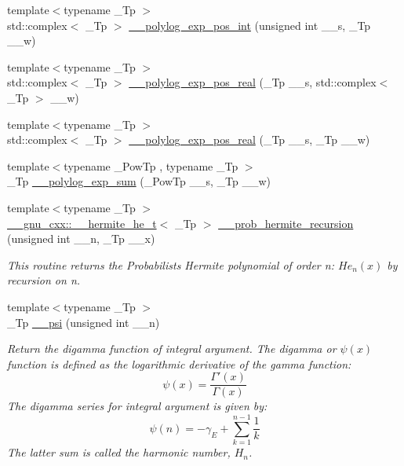 \begin{DoxyCompactItemize}
\item 
{\footnotesize template$<$typename \+\_\+\+Tp $>$ }\\std\+::complex$<$ \+\_\+\+Tp $>$ \hyperlink{namespacestd_1_1____detail_a6d05f9213f03b1781250cc048739e55b}{\+\_\+\+\_\+polylog\+\_\+exp\+\_\+pos\+\_\+int} (unsigned int \+\_\+\+\_\+s, \+\_\+\+Tp \+\_\+\+\_\+w)
\item 
{\footnotesize template$<$typename \+\_\+\+Tp $>$ }\\std\+::complex$<$ \+\_\+\+Tp $>$ \hyperlink{namespacestd_1_1____detail_a36da38ab2aa8a67c089412937d5a695b}{\+\_\+\+\_\+polylog\+\_\+exp\+\_\+pos\+\_\+real} (\+\_\+\+Tp \+\_\+\+\_\+s, std\+::complex$<$ \+\_\+\+Tp $>$ \+\_\+\+\_\+w)
\item 
{\footnotesize template$<$typename \+\_\+\+Tp $>$ }\\std\+::complex$<$ \+\_\+\+Tp $>$ \hyperlink{namespacestd_1_1____detail_a8a6390a3855283fc27a5d57dd736b62e}{\+\_\+\+\_\+polylog\+\_\+exp\+\_\+pos\+\_\+real} (\+\_\+\+Tp \+\_\+\+\_\+s, \+\_\+\+Tp \+\_\+\+\_\+w)
\item 
{\footnotesize template$<$typename \+\_\+\+Pow\+Tp , typename \+\_\+\+Tp $>$ }\\\+\_\+\+Tp \hyperlink{namespacestd_1_1____detail_acbdb1ad0debb8c919b4dcb1589af734c}{\+\_\+\+\_\+polylog\+\_\+exp\+\_\+sum} (\+\_\+\+Pow\+Tp \+\_\+\+\_\+s, \+\_\+\+Tp \+\_\+\+\_\+w)
\item 
{\footnotesize template$<$typename \+\_\+\+Tp $>$ }\\\hyperlink{struct____gnu__cxx_1_1____hermite__he__t}{\+\_\+\+\_\+gnu\+\_\+cxx\+::\+\_\+\+\_\+hermite\+\_\+he\+\_\+t}$<$ \+\_\+\+Tp $>$ \hyperlink{namespacestd_1_1____detail_aada7dabf929dbb464ef559feddf0ddc9}{\+\_\+\+\_\+prob\+\_\+hermite\+\_\+recursion} (unsigned int \+\_\+\+\_\+n, \+\_\+\+Tp \+\_\+\+\_\+x)
\begin{DoxyCompactList}\small\item\em This routine returns the Probabilists Hermite polynomial of order n\+: $ He_n(x) $ by recursion on n. \end{DoxyCompactList}\item 
{\footnotesize template$<$typename \+\_\+\+Tp $>$ }\\\+\_\+\+Tp \hyperlink{namespacestd_1_1____detail_a664d83a211283d0975ba40f3874c2d70}{\+\_\+\+\_\+psi} (unsigned int \+\_\+\+\_\+n)
\begin{DoxyCompactList}\small\item\em Return the digamma function of integral argument. The digamma or $ \psi(x) $ function is defined as the logarithmic derivative of the gamma function\+: \[ \psi(x) = \frac{\Gamma'(x)}{\Gamma(x)} \] The digamma series for integral argument is given by\+: \[ \psi(n) = -\gamma_E + \sum_{k=1}^{n-1} \frac{1}{k} \] The latter sum is called the harmonic number, $ H_n $. \end{DoxyCompactList}\item 

\end{DoxyCompactItemize}
